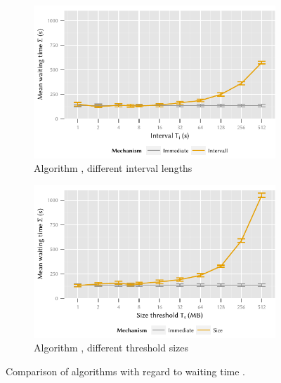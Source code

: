 \begin{figure}
	\begin{subfigure}[b]{\textwidth}
	\centering
	\includegraphics{application/cloud_file_synchronization/numerical_evaluation/figures/interval_delay}
	\caption{Algorithm \algointerval, different interval lengths \thresholdInterval}\label{fig:application:cloud_file_synchronisation:numerical_evaluation:waiting_time:waiting_time:interval}
	\end{subfigure} 
	\begin{subfigure}[b]{\textwidth}
	\centering
	\includegraphics{application/cloud_file_synchronization/numerical_evaluation/figures/size_delay}
	\caption{Algorithm \algosize, different threshold sizes \thresholdSize}\label{fig:application:cloud_file_synchronisation:numerical_evaluation:waiting_time:waiting_time:size}
	\end{subfigure}

	\caption{Comparison of algorithms with regard to waiting time \sojournTime.}\label{fig:application:cloud_file_synchronisation:numerical_evaluation:waiting_time:waiting_time}
\end{figure}


